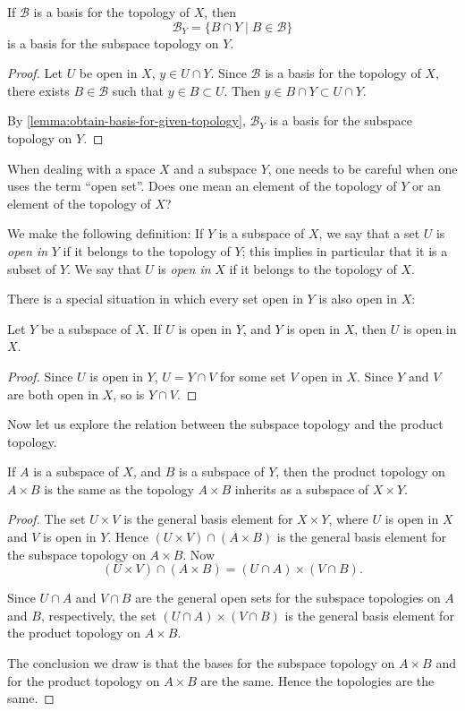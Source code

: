 \begin{lemma}
If $\mathcal{B}$ is a basis for the topology of $X$, then
\[\mathcal{B}_Y=\{B\cap Y\mid B\in\mathcal{B}\}\]
is a basis for the subspace topology on $Y$.
\end{lemma}

\begin{proof}
Let $U$ be open in $X$, $y\in U\cap Y$.
Since $\mathcal{B}$ is a basis for the topology of $X$, there exists $B\in\mathcal{B}$ such that $y\in B\subset U$. 
Then $y\in B\cap Y\subset U\cap Y$. 

By \ref{lemma:obtain-basis-for-given-topology}, $\mathcal{B}_Y$ is a basis for the subspace topology on $Y$.
\end{proof}

When dealing with a space $X$ and a subspace $Y$, one needs to be careful when one uses the term ``open set''. Does one mean an element of the topology of $Y$ or an
element of the topology of $X$? 

We make the following definition: If $Y$ is a subspace of $X$, we say that a set $U$ is \emph{open in} $Y$ if it belongs to the topology of $Y$; this implies in particular that it is a subset of $Y$. 
We say that $U$ is \emph{open in} $X$ if it belongs to the topology of $X$.

There is a special situation in which every set open in $Y$ is also open in $X$:

\begin{lemma}
Let $Y$ be a subspace of $X$. If $U$ is open in $Y$, and $Y$ is open in $X$, then $U$ is open in $X$.
\end{lemma}

\begin{proof}
Since $U$ is open in $Y$, $U=Y\cap V$ for some set $V$ open in $X$. Since $Y$ and $V$ are both open in $X$, so is $Y\cap V$.
\end{proof}

Now let us explore the relation between the subspace topology and the product topology.

\begin{lemma}
If $A$ is a subspace of $X$, and $B$ is a subspace of $Y$, then the product topology on $A\times B$ is the same as the topology $A\times B$ inherits as a subspace of $X\times Y$.
\end{lemma}

\begin{proof}
The set $U\times V$ is the general basis element for $X\times Y$, where $U$ is open in $X$ and $V$ is open in $Y$. 
Hence $(U\times V)\cap(A\times B)$ is the general basis element for the subspace topology on $A\times B$. 
Now
\[(U\times V)\cap(A\times B)=(U\cap A)\times(V\cap B).\]

Since $U\cap A$ and $V\cap B$ are the general open sets for the subspace topologies on $A$ and $B$, respectively, the set $(U\cap A)\times(V\cap B)$ is the general basis element for the product topology on $A\times B$.

The conclusion we draw is that the bases for the subspace topology on $A\times B$ and for the product topology on $A\times B$ are the same. Hence the topologies are the same.
\end{proof}
\pagebreak

